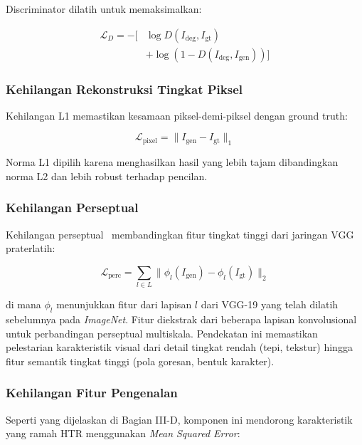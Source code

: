 \documentclass[journal]{IEEEtran}
\begin{document}
Discriminator dilatih untuk memaksimalkan:

\begin{equation}
\begin{split}
\mathcal{L}_D = -[&\log D(I_{\text{deg}}, I_{\text{gt}}) \\
&+ \log(1 - D(I_{\text{deg}}, I_{\text{gen}}))]
\end{split}
\end{equation}

\subsubsection{Kehilangan Rekonstruksi Tingkat Piksel}

Kehilangan L1 memastikan kesamaan piksel-demi-piksel dengan ground truth:

\begin{equation}
\mathcal{L}_{\text{pixel}} = \|I_{\text{gen}} - I_{\text{gt}}\|_1
\end{equation}

Norma L1 dipilih karena menghasilkan hasil yang lebih tajam dibandingkan norma L2 dan lebih robust terhadap pencilan.

\subsubsection{Kehilangan Perseptual}

Kehilangan perseptual~\cite{johnson2016perceptual} membandingkan fitur tingkat tinggi dari jaringan VGG praterlatih:

\begin{equation}
\mathcal{L}_{\text{perc}} = \sum_{l \in L} \|\phi_l(I_{\text{gen}}) - \phi_l(I_{\text{gt}})\|_2
\end{equation}

di mana $\phi_l$ menunjukkan fitur dari lapisan $l$ dari VGG-19 yang telah dilatih sebelumnya pada \textit{ImageNet}. Fitur diekstrak dari beberapa lapisan konvolusional untuk perbandingan perseptual multiskala. Pendekatan ini memastikan pelestarian karakteristik visual dari detail tingkat rendah (tepi, tekstur) hingga fitur semantik tingkat tinggi (pola goresan, bentuk karakter).

\subsubsection{Kehilangan Fitur Pengenalan}

Seperti yang dijelaskan di Bagian III-D, komponen ini mendorong karakteristik yang ramah HTR menggunakan \textit{Mean Squared Error}:
\end{document}

